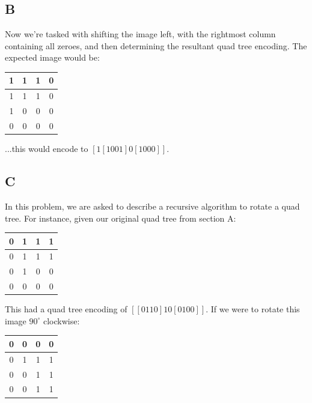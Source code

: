 \documentclass{article}
\begin{document}
\subsection*{B}

Now we're tasked with shifting the image left, with the rightmost column containing all zeroes, and then determining the resultant quad tree encoding. The expected image would be:

\begin{center}
    \begin{tabular}{ | c | c | c | c | }
        \hline
        1 & 1 & 1 & 0 \\ 
        \hline
        1 & 1 & 1 & 0 \\ 
        \hline
        1 & 0 & 0 & 0 \\ 
        \hline
        0 & 0 & 0 & 0 \\ 
        \hline  
    \end{tabular}
\end{center}

\noindent ...this would encode to $[1[1001]0[1000]]$.

\subsection*{C}

In this problem, we are asked to describe a recursive algorithm to rotate a quad tree. For instance, given our original quad tree from section A:

\begin{center}
    \begin{tabular}{ | c | c | c | c | }
        \hline
        0 & 1 & 1 & 1 \\ 
        \hline
        0 & 1 & 1 & 1 \\ 
        \hline
        0 & 1 & 0 & 0 \\ 
        \hline
        0 & 0 & 0 & 0 \\ 
        \hline  
    \end{tabular}
\end{center}

\noindent This had a quad tree encoding of $[[0110]10[0100]]$. If we were to rotate this image $90^\circ$ clockwise:

\begin{center}
    \begin{tabular}{ | c | c | c | c | }
        \hline
        0 & 0 & 0 & 0 \\ 
        \hline
        0 & 1 & 1 & 1 \\
        \hline
        0 & 0 & 1 & 1 \\
        \hline
        0 & 0 & 1 & 1 \\
        \hline
    \end{tabular}
\end{center}
\end{document}
